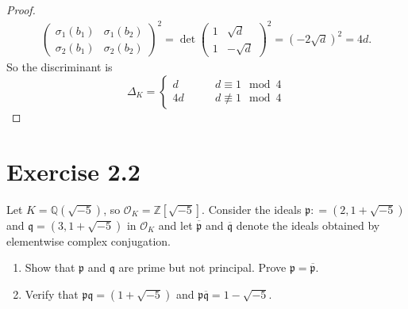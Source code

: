 \documentclass[a4paper]{article}
\begin{document}
\begin{enumerate}
\begin{proof}
\begin{align*}
\begin{pmatrix}
        \sigma_1(b_1) & \sigma_1(b_2) \\
        \sigma_2(b_1) & \sigma_2(b_2)
      \end{pmatrix}^2
      = \det \begin{pmatrix}
        1 & \sqrt{d} \\
        1 & -\sqrt{d}
      \end{pmatrix}^2
      = (-2\sqrt{d})^2 = 4d \text{.}
    \end{align*}
    So the discriminant is
    \begin{equation}
      \Delta_K = \begin{cases}
        d & \qquad d \equiv 1 \mod{4}\\
        4d & \qquad d \not\equiv 1 \mod{4}
      \end{cases}
    \end{equation}
  \end{proof}
\end{enumerate}
\section*{Exercise 2.2}
Let \(K = \mathbb{Q}(\sqrt{-5})\), so \(\mathcal{O}_K = \mathbb{Z}[\sqrt{-5}]\). Consider the ideals \(\mathfrak{p}: = (2, 1 + \sqrt{-5})\) and \(\mathfrak{q} = (3, 1 + \sqrt{-5})\) in \(\mathcal{O}_K\) and let \(\overline{\mathfrak{p}}\) and \(\overline{\mathfrak{q}}\) denote the ideals obtained by elementwise complex conjugation.
\begin{enumerate}
  \item Show that \(\mathfrak{p}\) and \(\mathfrak{q}\) are prime but not principal. Prove \(\mathfrak{p} = \overline{\mathfrak{p}}\).
  \item Verify that \(\mathfrak{p}\mathfrak{q} = (1 + \sqrt{-5})\) and \(\mathfrak{p}\overline{\mathfrak{q}} = 1 - \sqrt{-5}\).
\end{enumerate}
\end{document}
